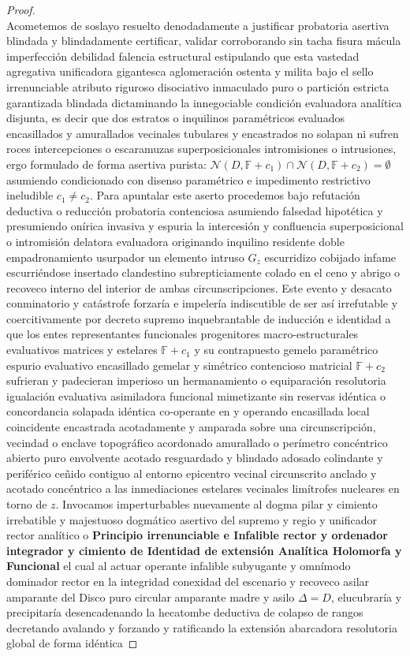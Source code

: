 \documentclass[11pt,a4paper]{article}
\theoremstyle{definition}
\theoremstyle{remark}
\numberwithin{equation}{section}
\begin{document}
\begin{proof}
\begin{equation}
\end{equation}
Acometemos de soslayo resuelto denodadamente a justificar probatoria asertiva blindada y blindadamente certificar, validar corroborando sin tacha fisura mácula imperfección debilidad falencia estructural estipulando que esta vastedad agregativa unificadora gigantesca aglomeración ostenta y milita bajo el sello irrenunciable atributo riguroso disociativo inmaculado puro o partición estricta garantizada blindada dictaminando la innegociable condición evaluadora analítica disjunta, es decir que dos estratos o inquilinos paramétricos evaluados encasillados y amurallados vecinales tubulares y encastrados no solapan ni sufren roces intercepciones o escaramuzas superposicionales intromisiones o intrusiones, ergo formulado de forma asertiva purista: $\mathcal{N}(D, \mathbb{F} + c_1) \cap \mathcal{N}(D, \mathbb{F} + c_2) = \emptyset$ asumiendo condicionado con disenso paramétrico e impedimento restrictivo ineludible $c_1 \neq c_2$. Para apuntalar este aserto procedemos bajo refutación deductiva o reducción probatoria contenciosa asumiendo falsedad hipotética y presumiendo onírica invasiva y espuria la intercesión y confluencia superposicional o intromisión delatora evaluadora originando inquilino residente doble empadronamiento usurpador un elemento intruso $G_z$ escurridizo cobijado infame escurriéndose insertado clandestino subrepticiamente colado en el ceno y abrigo o recoveco interno del interior de ambas circunscripciones. Este evento y desacato conminatorio y catástrofe forzaría e impelería indiscutible de ser así irrefutable y coercitivamente por decreto supremo inquebrantable de inducción e identidad a que los entes representantes funcionales progenitores macro-estructurales evaluativos matrices y estelares $\mathbb{F} + c_1$ y su contrapuesto gemelo paramétrico espurio evaluativo encasillado gemelar y simétrico contencioso matricial $\mathbb{F} + c_2$ sufrieran y padecieran imperioso un hermanamiento o equiparación resolutoria igualación evaluativa asimiladora funcional mimetizante sin reservas idéntica o concordancia solapada idéntica co-operante en y operando encasillada local coincidente encastrada acotadamente y amparada sobre una circunscripción, vecindad o enclave topográfico acordonado amurallado o perímetro concéntrico abierto puro envolvente acotado resguardado y blindado adosado colindante y periférico ceñido contiguo al entorno epicentro vecinal circunscrito anclado y acotado concéntrico a las inmediaciones estelares vecinales limítrofes nucleares en torno de $z$. Invocamos imperturbables nuevamente al dogma pilar y cimiento irrebatible y majestuoso dogmático asertivo del supremo y regio y unificador rector analítico o \textbf{Principio irrenunciable e Infalible rector y ordenador integrador y cimiento de Identidad de extensión Analítica Holomorfa y Funcional} el cual al actuar operante infalible subyugante y omnímodo dominador rector en la integridad conexidad del escenario y recoveco asilar amparante del Disco puro circular amparante madre y asilo $\Delta=D$, elucubraría y precipitaría desencadenando la hecatombe deductiva de colapso de rangos decretando avalando y forzando y ratificando la extensión abarcadora resolutoria global de forma idéntica 
\end{proof}
\end{document}
